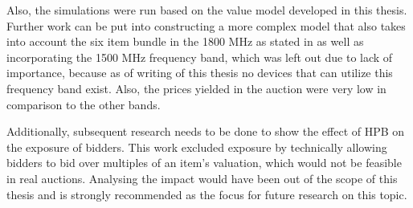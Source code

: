 Also, the simulations were run based on the value model developed in this thesis. Further work can be put into constructing a more complex model that also takes into account the six item bundle in the 1800 MHz as stated in \cite{Bichler2016} as well as incorporating the 1500 MHz frequency band, which was left out due to lack of importance, because as of writing of this thesis no 
devices that can utilize this frequency band exist. Also, the prices yielded in the auction were very low in comparison to the other bands.

Additionally, subsequent research needs to be done to show the effect of HPB on the exposure of bidders. This work excluded exposure by technically allowing bidders to bid over multiples of an item's valuation, which would not be feasible in real auctions. Analysing the impact would have been out of the scope of this thesis and is strongly recommended as the focus for future research on this topic. 


%
